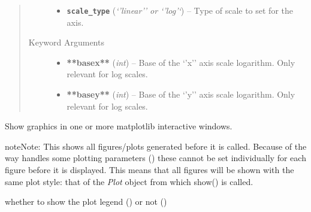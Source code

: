 \documentclass[a4paper,10pt,english]{sphinxmanual}
\begin{document}
\begin{fulllineitems}
\begin{fulllineitems}
\begin{quote}
\begin{description}
\begin{itemize}
\item {} 
\textbf{\texttt{scale\_type}} (\emph{`'linear'' or `'log'`}) -- Type of scale to set for the axis.

\end{itemize}

\item[{Keyword Arguments}] \leavevmode\begin{itemize}
\item {} 
\textbf{**basex**} (\emph{int}) --
Base of the `'x'' axis scale logarithm. Only relevant for log
scales.

\item {} 
\textbf{**basey**} (\emph{int}) --
Base of the `'y'' axis scale logarithm. Only relevant for log
scales.

\end{itemize}

\end{description}\end{quote}

\end{fulllineitems}


\begin{fulllineitems}
\label{index:kafe.plot.Plot.show}
Show graphics in one or more matplotlib interactive windows.

\begin{notice}{note}{Note:}
This shows all figures/plots generated before it is called. Because
of the way  handles some plotting parameters
() these cannot be set individually for each
figure before it is displayed. This means that all figures will be
shown with the same plot style: that of the \emph{Plot} object from
which show() is called.
\end{notice}

\end{fulllineitems}


\begin{fulllineitems}
\label{index:kafe.plot.Plot.show_legend}
whether to show the plot legend () or not ()

\end{fulllineitems}


\end{fulllineitems}
\end{document}

